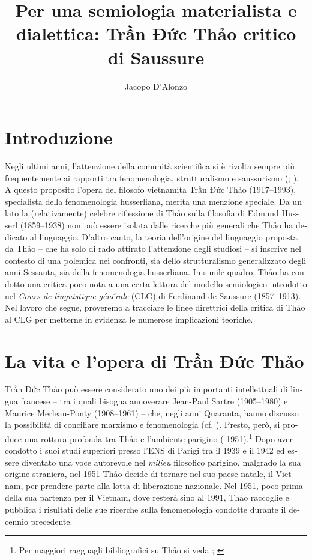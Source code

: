 \documentclass[output=paper]{../langscibook}
\author{Jacopo D’Alonzo\affiliation{Sapienza Università di Roma}\orcid{}}
\title{Per una semiologia materialista e dialettica: Trần Đức Thảo critico di Saussure}
\begin{document}
\begin{otherlanguage}{italian}
\maketitle

\section{Introduzione} 

 Negli ultimi anni, l’attenzione della comunità scientifica si è rivolta sempre più frequentemente ai rapporti tra fenomenologia, strutturalismo e saussurismo (\citealt{de_palo_saussure_2016}; \citealt{aurora_filosofia_2017}). A questo proposito l’opera del filosofo vietnamita Trần Đức Thảo (1917--1993), specialista della fenomenologia husserliana, merita una menzione speciale. Da un lato la (relativamente) celebre riflessione di Thảo sulla filosofia di Edmund Husserl (1859--1938) non può essere isolata dalle ricerche più generali che Thảo ha dedicato al linguaggio. D’altro canto, la teoria dell’origine del linguaggio proposta da Thảo – che ha solo di rado attirato l’attenzione degli studiosi – si inscrive nel contesto di una polemica nei confronti, sia dello strutturalismo generalizzato degli anni Sessanta, sia della fenomenologia husserliana. In simile quadro, Thảo ha condotto una critica poco nota a una certa lettura del modello semiologico introdotto nel \textit{Cours de linguistique générale} (CLG) di Ferdinand de Saussure (1857--1913). Nel lavoro che segue, proveremo a tracciare le linee direttrici della critica di Thảo al CLG per metterne in evidenza le numerose implicazioni teoriche.

\section{La vita e l’opera di Trần Đức Thảo} 

Trần Đức Thảo può essere considerato uno dei più importanti intellettuali di lingua francese – tra i quali bisogna annoverare Jean-Paul Sartre (1905--1980) e Maurice Merleau-Ponty (1908--1961) – che, negli anni Quaranta, hanno discusso la possibilità di conciliare marxismo e fenomenologia (cf. \citealt{thao_marxisme_1946,thao_existentialisme_1949}). Presto, però, si produce una rottura profonda tra Thảo e l’ambiente parigino (\citealt{thao_les_1950,thao_phenomenologie_1951} 1951).\footnote{{Per maggiori ragguagli bibliografici su Thảo si veda \citealt[1--11]{thao_formation_1991}; \citealt{thao_note_1993,giao_ecrits_1988,hemery_itineraire_2013,thao_les_2004,thao_quelques_2013,feron_qui_2014}}} Dopo aver condotto i suoi studi superiori presso l’ENS di Parigi tra il 1939 e il 1942 ed essere diventato una voce autorevole nel \textit{milieu} filosofico parigino, malgrado la sua origine straniera, nel 1951 Thảo decide di tornare nel suo paese natale, il Vietnam, per prendere parte alla lotta di liberazione nazionale. Nel 1951, poco prima della sua partenza per il Vietnam, dove resterà sino al 1991, Thảo raccoglie e pubblica i risultati delle sue ricerche sulla fenomenologia condotte durante il decennio precedente.


\end{otherlanguage}
\end{document}
